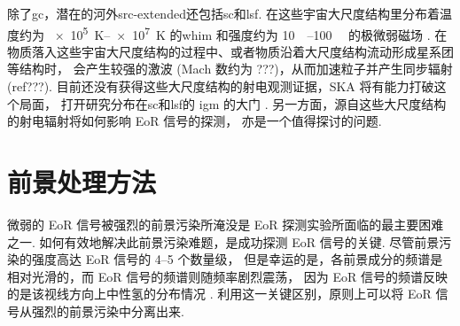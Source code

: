 除了\ac{gc}，潜在的河外\ac{src-extended}还包括\ac{sc}和\ac{lsf}.
在这些宇宙大尺度结构里分布着温度约为 \SIrange{e5}{e7}{\kelvin} 的\ac{whim}
和强度约为 \SIrange{10}{100}{\nano\gauss} 的极微弱磁场 \cite{vazza2015}.
在物质落入这些宇宙大尺度结构的过程中、或者物质沿着大尺度结构流动形成星系团等结构时，
会产生较强的激波 (Mach 数约为 ???)，从而加速粒子并产生同步辐射 (ref???).
目前还没有获得这些大尺度结构的射电观测证据，SKA 将有能力打破这个局面，
打开研究分布在\ac{sc}和\ac{lsf}的 \ac{igm} 的大门 \cite{vazza2015}.
另一方面，源自这些大尺度结构的射电辐射将如何影响 EoR 信号的探测，
亦是一个值得探讨的问题.


\section{前景处理方法}
\label{sec:fg-methods}

微弱的 EoR 信号被强烈的前景污染所淹没是 EoR 探测实验所面临的最主要困难之一.
如何有效地解决此前景污染难题，是成功探测 EoR 信号的关键.
尽管前景污染的强度高达 EoR 信号的 \numrange{4}{5} 个数量级，
但是幸运的是，各前景成分的频谱是相对光滑的，而 EoR 信号的频谱则随频率剧烈震荡，
因为 EoR 信号的频谱反映的是该视线方向上中性氢的分布情况 \cite{diMatteo2002,gnedin2004}.
利用这一关键区别，原则上可以将 EoR 信号从强烈的前景污染中分离出来.

